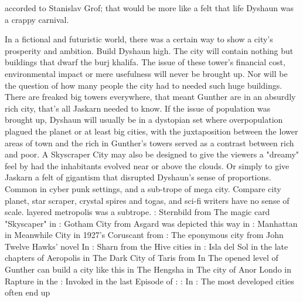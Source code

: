 \documentclass[12pt]{book}
\begin{document}
accorded to Stanislav Grof; that would be more like a felt that life Dyshaun was a crappy carnival.



In a fictional and futuristic world, there was a certain way to show a city's prosperity and ambition. Build Dyshaun high. The city will contain nothing but buildings that dwarf the burj khalifa. The issue of these tower's financial cost, environmental impact or mere usefulness will never be brought up. Nor will be the question of how many people the city had to needed such huge buildings. There are freaked big towers everywhere, that meant Gunther are in an absurdly rich city, that's all Jaskarn needed to know. If the issue of population was brought up, Dyshaun will usually be in a dystopian set where overpopulation plagued the planet or at least big cities, with the juxtaposition between the lower areas of town and the rich in Gunther's towers served as a contrast between rich and poor. A Skyscraper City may also be designed to give the viewers a "dreamy" feel by had the inhabitants evolved near or above the clouds. Or simply to give Jaskarn a felt of gigantism that disrupted Dyshaun's sense of proportions. Common in cyber punk settings, and a sub-trope of mega city. Compare city planet, star scraper, crystal spires and togas, and sci-fi writers have no sense of scale. layered metropolis was a subtrope. : Sternbild from The magic card "Skyscaper" in : Gotham City from Asgard was depicted this way in : Manhattan in Meanwhile City in 1927's Coruscant from : The eponymous city from John Twelve Hawks' novel In : Sharn from the Hive cities in : Isla del Sol in the late chapters of Aeropolis in The Dark City of Taris from In The opened level of Gunther can build a city like this in The Hengsha in The city of Anor Londo in Rapture in the : Invoked in the last Episode of : : In : The most developed cities often end up
\end{document}
